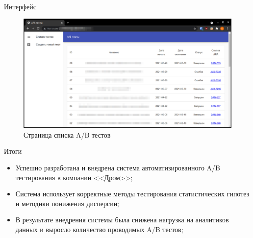 \documentclass[12pt, unicode]{beamer}
\begin{document}
	\begin{frame}[fragile]{Интерфейс}
		\begin{figure}[h]
			\centering
			\includegraphics[width=\textwidth]{main_page.png}
			\caption{Страница списка A/B тестов}
		\end{figure}
	\end{frame}


	\begin{frame}[fragile]{Итоги}
		\begin{block}{}
			\begin{itemize}
				\item Успешно разработана и внедрена система автоматизированного A/B тестирования в компании <<Дром>>;
				\item Система использует корректные методы тестирования статистических гипотез и методики понижения дисперсии;
				\item В результате внедрения системы была снижена нагрузка на аналитиков данных и выросло количество проводимых A/B тестов;
			\end{itemize}
		\end{block}
	\end{frame}

    
\end{document}
